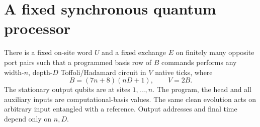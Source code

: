 \section{A fixed synchronous quantum processor}\label{sec:processor}
\begin{lemma}\label{lem:processor}
There is a fixed on-site word $U$ and a fixed exchange $E$ on finitely many opposite port pairs such that a programmed basis row of $B$ commands performs any width-$n$, depth-$D$ Toffoli/Hadamard circuit in $V$ native ticks, where
\begin{equation}\label{eq:interpretertime}
 B=(7n+8)(nD+1),\qquad V=2B.
\end{equation}
The stationary output qubits are at sites $1,\ldots,n$. The program, the head and all auxiliary inputs are computational-basis values. The same clean evolution acts on arbitrary input entangled with a reference. Output addresses and final time depend only on $n,D$.
\end{lemma}
